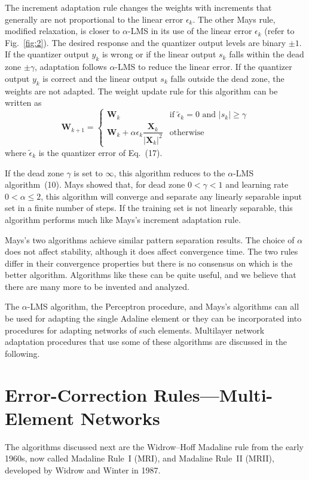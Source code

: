 \documentclass[10pt,twocolumn]{article}
\newcommand{\X}{\bm{X}}
\newcommand{\W}{\bm{W}}
\begin{document}
The increment adaptation rule changes the weights with increments that generally
are not proportional to the linear error $\epsilon_k$. The other Mays rule,
modified relaxation, is closer to $\alpha$-LMS in its use of the linear error
$\epsilon_k$ (refer to Fig.~\ref{fig:2}). The desired response and the quantizer
output levels are binary $\pm 1$. If the quantizer output $y_k$ is wrong or if the
linear output $s_k$ falls within the dead zone $\pm\gamma$, adaptation follows
$\alpha$-LMS to reduce the linear error. If the quantizer output $y_k$ is correct
and the linear output $s_k$ falls outside the dead zone, the weights are not
adapted. The weight update rule for this algorithm can be written as
\begin{equation}
\W_{k+1}=
\begin{cases}
\W_k & \text{if } \tilde{\epsilon}_k = 0 \text{ and } |s_k| \ge \gamma\\[1.0ex]
\W_k + \alpha\epsilon_k\dfrac{\X_k}{|\X_k|^2} & \text{otherwise}
\end{cases}\tag{20}
\end{equation}
where $\tilde{\epsilon}_k$ is the quantizer error of Eq.~(17).

If the dead zone $\gamma$ is set to $\infty$, this algorithm reduces to the
$\alpha$-LMS algorithm~(10). Mays showed that, for dead zone $0 < \gamma < 1$ and
learning rate $0 < \alpha \le 2$, this algorithm will converge and separate any
linearly separable input set in a finite number of steps. If the training set is
not linearly separable, this algorithm performs much like Mays's increment
adaptation rule.

Mays's two algorithms achieve similar pattern separation results. The choice of
$\alpha$ does not affect stability, although it does affect convergence time. The
two rules differ in their convergence properties but there is no consensus on which
is the better algorithm. Algorithms like these can be quite useful, and we believe
that there are many more to be invented and analyzed.

The $\alpha$-LMS algorithm, the Perceptron procedure, and Mays's algorithms can all
be used for adapting the single Adaline element or they can be incorporated into
procedures for adapting networks of such elements. Multilayer network adaptation
procedures that use some of these algorithms are discussed in the following.

\section{Error-Correction Rules---Multi-Element Networks}
The algorithms discussed next are the Widrow--Hoff Madaline rule from the early
1960s, now called Madaline Rule~I (MRI), and Madaline Rule~II (MRII), developed
by Widrow and Winter in 1987.
\end{document}
